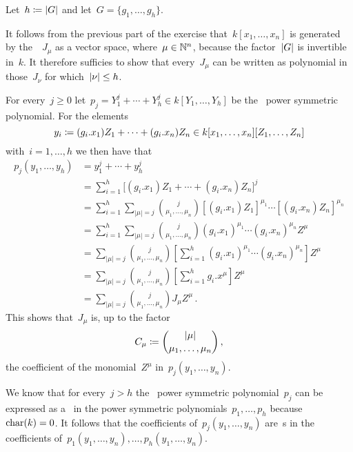 Let~$h \coloneqq \lvert G\rvert$ and let~$G = \{g_1, \dotsc, g_h\}$.

It follows from the previous part of the exercise that~$k[x_1, \dotsc, x_n]$ is generated by the~~$J_\mu$ as a vector space, where~$\mu \in \mathbb{N}^n$, because the factor~$\lvert G\rvert$ is invertible in~$k$.
It therefore sufficies to show that every~$J_\mu$ can be written as polynomial in those~$J_\nu$ for which~$\lvert\nu\rvert \leq h$.
  
For every~$j \geq 0$ let~$p_j = Y_1^j + \dotsb + Y_h^j \in k[Y_1, \dotsc, Y_h]$ be the~ power symmetric polynomial.
For the elements
\[
            y_i
  \coloneqq  (g_i.x_1) Z_1 + \dotsb + (g_i.x_n) Z_n
  \in       k[x_1, \dotsc, x_n][Z_1, \dotsc, Z_n]
\]
with~$i = 1, \dotsc, h$ we then have that
\begingroup
\allowdisplaybreaks
\begin{align*}
      p_j(y_1, \dotsc, y_h)
  &=  y_1^j + \dotsb + y_h^j  \\
  &=  \sum_{i=1}^h \bigl[ (g_i.x_1) Z_1 + \dotsb + (g_i.x_n) Z_n \bigr]^j  \\
  &=  \sum_{i=1}^h \sum_{|\mu| = j}
      \binom{j}{\mu_1, \dotsc, \mu_n} [(g_i.x_1) Z_1]^{\mu_1} \dotsm [(g_i.x_n) Z_n]^{\mu_n}  \\
  &=  \sum_{i=1}^h \sum_{|\mu| = j}
      \binom{j}{\mu_1, \dotsc, \mu_n} (g_i.x_1)^{\mu_1} \dotsm (g_i.x_n)^{\mu_n} Z^\mu \\
  &=  \sum_{|\mu| = j} \binom{j}{\mu_1, \dotsc, \mu_n}
      \left[
        \sum_{i=1}^h (g_i.x_1)^{\mu_1} \dotsm (g_i.x_n)^{\mu_n}
      \right]
      Z^\mu  \\
  &=  \sum_{|\mu| = j} \binom{j}{\mu_1, \dotsc, \mu_n}
      \left[
        \sum_{i=1}^h g_i.x^\mu
      \right]
      Z^\mu  \\
  &=  \sum_{|\mu| = j} \binom{j}{\mu_1, \dotsc, \mu_n} J_\mu Z^\mu \,.
\end{align*}
\endgroup
This shows that~$J_\mu$ is, up to the factor
\[
            C_\mu
  \coloneqq  \binom{|\mu|}{\mu_1, \dotsc, \mu_n} \,,
\]
the coefficient of the monomial~$Z^\mu$ in~$p_j(y_1, \dotsc, y_n)$.

We know that for every~$j > h$ the~ power symmetric polynomial~$p_j$ can be expressed as a~ in the power symmetric polynomials~$p_1, \dotsc, p_h$ because~$\operatorname{char}(k) = 0$.
It follows that the coefficients of~$p_j(y_1, \dotsc, y_n)$ are~s in the coefficients of~$p_1(y_1, \dotsc, y_n), \dotsc, p_h(y_1, \dotsc, y_n)$.

